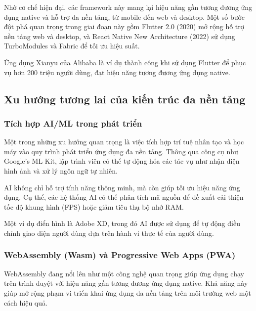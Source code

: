 \vspace{0.5em}

Nhờ cơ chế hiện đại, các framework này mang lại hiệu năng gần tương đương ứng dụng native và hỗ trợ đa nền tảng, từ mobile đến web và desktop. Một số bước đột phá quan trọng trong giai đoạn này gồm Flutter 2.0 (2020) mở rộng hỗ trợ nền tảng web và desktop, và React Native New Architecture (2022) sử dụng TurboModules và Fabric để tối ưu hiệu suất.

\vspace{0.5em}

\indent Ứng dụng Xianyu của Alibaba là ví dụ thành công khi sử dụng Flutter để phục vụ hơn 200 triệu người dùng, đạt hiệu năng tương đương ứng dụng native.
\subsection{Xu hướng tương lai của kiến trúc đa nền tảng}
\renewcommand{\labelitemi}{--}

\subsubsection{Tích hợp AI/ML trong phát triển}

Một trong những xu hướng quan trọng là việc tích hợp trí tuệ nhân tạo và học máy vào quy trình phát triển ứng dụng đa nền tảng. Thông qua công cụ như Google’s ML Kit, lập trình viên có thể tự động hóa các tác vụ như nhận diện hình ảnh và xử lý ngôn ngữ tự nhiên.

\vspace{0.5em}

AI không chỉ hỗ trợ tính năng thông minh, mà còn giúp tối ưu hiệu năng ứng dụng. Cụ thể, các hệ thống AI có thể phân tích mã nguồn để đề xuất cải thiện tốc độ khung hình (FPS) hoặc giảm tiêu thụ bộ nhớ RAM.

\vspace{0.5em}

Một ví dụ điển hình là Adobe XD, trong đó AI được sử dụng để tự động điều chỉnh giao diện người dùng dựa trên hành vi thực tế của người dùng.


\subsubsection{WebAssembly (Wasm) và Progressive Web Apps (PWA)}

WebAssembly đang nổi lên như một công nghệ quan trọng giúp ứng dụng chạy trên trình duyệt với hiệu năng gần tương đương ứng dụng native.  
Khả năng này giúp mở rộng phạm vi triển khai ứng dụng đa nền tảng trên môi trường web một cách hiệu quả.

